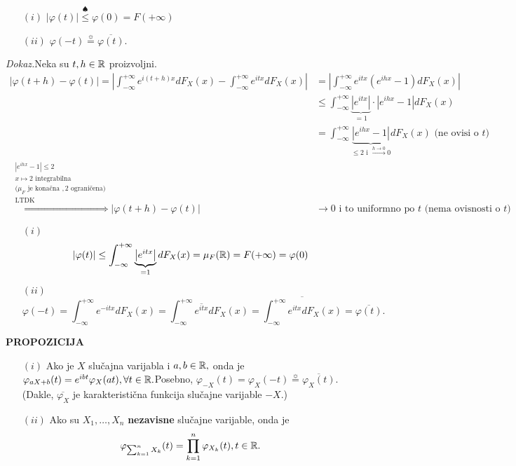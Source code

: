 \documentclass{article}
\begin{document}
\begin{enumerate}
    \item[\((i)\)] \(|\varphi(t)|\overset{\spadesuit}{\le}\varphi(0)=F(+\infty)\)
    \item[\((ii)\)] \(\varphi(-t)\overset{\sun}{=}\overline{\varphi(t)}.\)
\end{enumerate}
\textit{Dokaz.}\newline Neka su \(t,h\in\Bbb R\) proizvoljni. \[\begin{aligned}|\varphi(t+h)-\varphi(t)|=\left|\int_{-\infty}^{+\infty}e^{i(t+h)x}dF_X(x)-\int_{-\infty}^{+\infty}e^{itx}dF_X(x)\right|&=\left|\int_{-\infty}^{+\infty}e^{itx}\left(e^{ihx}-1\right)dF_X(x)\right|\\&\le\int_{-\infty}^{+\infty}\underbrace{\left|e^{itx}\right|}_{=1}\cdot\left|e^{ihx}-1\right|dF_X(x)\\&=\int_{-\infty}^{+\infty}\underbrace{\left|e^{ihx}-1\right|}_{\le 2\text{ i }\overset{h\to 0}{\longrightarrow}0}dF_X(x)\text{ (ne ovisi o }t)\\\overset{\substack{\left|e^{ihx}-1\right|\le 2\\x\mapsto 2\text{ integrabilna}\\(\mu_F\text{ je konačna }, 2\text{ ograničena)}\\\text{LTDK}}}{\Rightarrow}|\varphi(t+h)-\varphi(t)|&\to 0\text{ i to uniformno po }t\text{ (nema ovisnosti o }t)\end{aligned}\]
\begin{enumerate}
    \item[\((i)\)] \[|\varphi(t)|\le\int_{-\infty}^{+\infty}\underbrace{\left|e^{itx}\right|}_{=1}dF_X(x)=\mu_F(\Bbb R)=F(+\infty)=\varphi(0)\]
    \item[\((ii)\)] \[\varphi(-t)=\int_{-\infty}^{+\infty}e^{-itx}dF_X(x)=\int_{-\infty}^{+\infty}\overline{e^{itx}}dF_X(x)=\overline{\int_{-\infty}^{+\infty}e^{itx}dF_X(x)}=\overline{\varphi(t)}.\]
\end{enumerate}
\newpage
\textbf{PROPOZICIJA}
\begin{enumerate}
    \item[\((i)\)] Ako je \(X\) slučajna varijabla i \(a,b\in\Bbb R,\) onda je \(\varphi_{aX+b}(t)=e^{ibt}\varphi_X(at),\forall t\in\Bbb R.\)\newline Posebno, \(\varphi_{-X}(t)=\varphi_X(-t)\overset{\sun}{=}\overline{\varphi_X(t)}.\) (Dakle, \(\overline{\varphi_X}\) je karakteristična funkcija slučajne varijable \(-X.\)) 
    \item[\((ii)\)] Ako su \(X_1,\ldots,X_n\) \textbf{nezavisne} slučajne varijable, onda je \[\varphi_{\sum_{k=1}^nX_k}(t)=\prod_{k=1}^n\varphi_{X_k}(t),t\in\Bbb R.\]
\end{enumerate}
\end{document}
